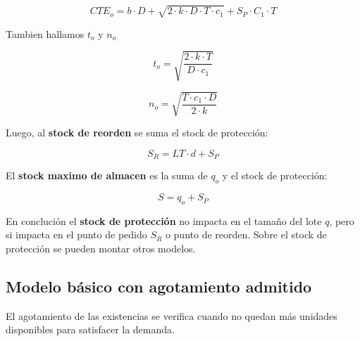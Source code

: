 \documentclass{article}
\begin{document}
\begin{equation}
    CTE_o = b \cdot D + \sqrt{2 \cdot k \cdot D \cdot T \cdot c_1} + S_P \cdot C_1 \cdot T
\end{equation}

Tambien hallamos \(t_o\) y \(n_o\)

\begin{equation}
    t_o = \sqrt{\frac{2 \cdot k \cdot T}{D \cdot c_1}}
\end{equation}

\begin{equation}
    n_o = \sqrt{\frac{T \cdot c_1 \cdot D}{2 \cdot k}}
\end{equation}

Luego, al \textbf{stock de reorden} se suma el stock de protección:

\begin{equation}
    S_R = LT \cdot d + S_P
\end{equation}

El \textbf{stock maximo de almacen} es la suma de \(q_o\) y el stock de protección:

\begin{equation}
    S = q_o + S_P
\end{equation}

En conclución el \textbf{stock de protección} no impacta en el tamaño del lote \(q\), pero si impacta en el punto de 
pedido \(S_R\) o punto de reorden. Sobre el stock de protección se pueden montar otros modelos. 





\newpage
\subsection{Modelo básico con agotamiento admitido}

El agotamiento de las existencias se verifica cuando no quedan más unidades disponibles para satisfacer la demanda.
\end{document}
